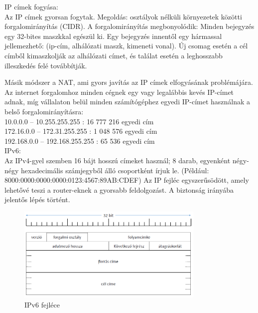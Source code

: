\documentclass[margin=0px]{article}
\begin{document}
\begin{description}
\begin{itemize}
                  IP címek fogyása:\\
                  Az IP címek gyorsan fogytak. Megoldás: osztályok nélküli környezetek közötti forgalomirányítás (CIDR). A forgalomirányítás megbonyolódik: Minden bejegyzés egy 32-bites maszkkal egészül ki. Egy bejegyzés innentől egy hármassal jellemezhető: (ip-cím, alhálózati maszk, kimeneti vonal). Új csomag esetén a cél címből kimaszkolják az alhálózati címet, és találat esetén a leghosszabb illeszkedés felé továbbítják.

                  Másik módszer a NAT, ami gyors javítás az IP címek elfogyásának problémájára. Az internet forgalomhoz minden cégnek egy vagy legalábbis kevés IP-címet adnak, míg vállalaton belül minden számítógéphez egyedi IP-címet használnak a belső forgalomirányításra: \\
                  10.0.0.0 – 10.255.255.255 : 16 777 216 egyedi cím\\
                  172.16.0.0 – 172.31.255.255 : 1 048 576 egyedi cím\\
                  192.168.0.0 – 192.168.255.255 : 65 536 egyedi cím\\

                  IPv6:\\
                  Az IPv4-gyel szemben 16 bájt hosszú címeket használ; 8 darab, egyenként négy-négy hexadecimális számjegyből álló csoportként írjuk le. (Például: 8000:0000:0000:0000:0123:4567:89AB:CDEF) Az IP fejléc egyszerűsödött, amely lehetővé teszi a router-eknek a gyorsabb feldolgozást. A biztonság irányába jelentős lépés történt.

                  \begin{figure}[H]
                      \centering
                      \includegraphics[width=0.8\textwidth]{img/ipv6.png}
                      \caption{IPv6 fejléce}
                  \end{figure}



\end{itemize}
\end{description}
\end{document}
